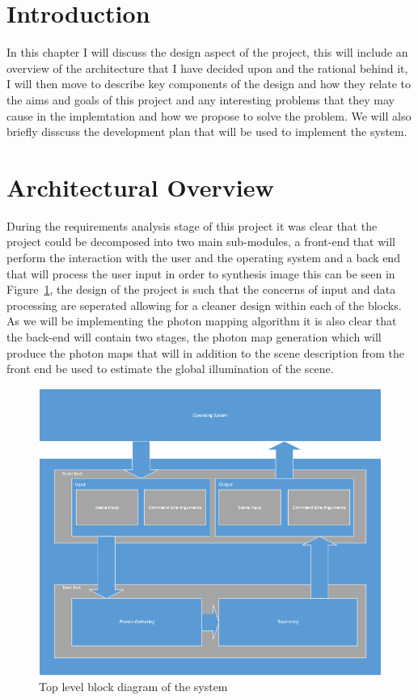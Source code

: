 \section{Introduction}
In this chapter I will discuss the design aspect of the project, this will include an overview of the
architecture that I have decided upon and the rational behind it, I will then move to describe key components of
the design and how they relate to the aims and goals of this project and any interesting problems that they
may cause in the implemtation and how we propose to solve the problem. We will also briefly disscuss the
development plan that will be used to implement the system.

\section{Architectural Overview}
During the requirements analysis stage of this project it was clear that the project could be decomposed into
two main sub-modules, a front-end that will perform the interaction with the user and the operating system and a
back end that will process the user input in order to synthesis image this can be seen in 
Figure~\ref{fig:design_blocks}, the design of the project is such that the concerns of input and data processing
are seperated allowing for a cleaner design within each of the blocks. As we will be implementing the photon mapping
algorithm it is also clear that the back-end will contain two stages, the photon map generation which will produce the
photon maps that will in addition to the scene description from the front end be used to estimate the global illumination
of the scene.

\begin{figure}
\centering
\includegraphics[scale=0.75]{./design/TopLevel.png}
\caption{Top level block diagram of the system}
\label{fig:design_blocks}
\end{figure}

\newpage

\newpage


